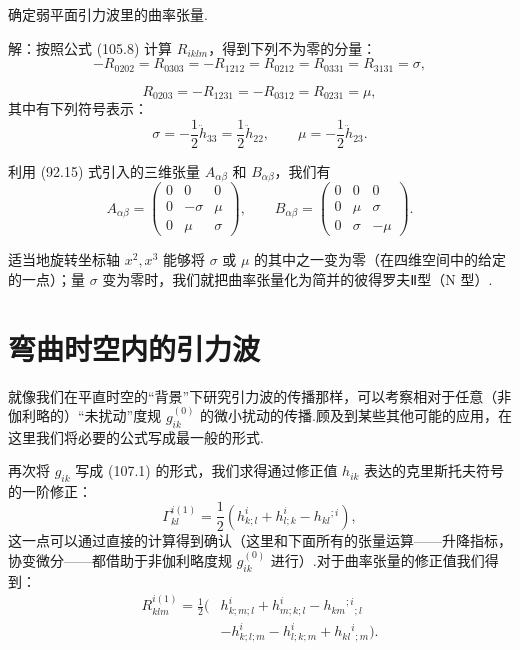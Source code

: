\begin{xiti}

\quad 确定弱平面引力波里的曲率张量.

解：按照公式 (105.8) 计算 $R_{iklm}$，得到下列不为零的分量：
\begin{equation*}
  -R_{0202}=R_{0303}=-R_{1212}=R_{0212}=R_{0331}=R_{3131}=\sigma,
\end{equation*}

\begin{equation*}
  R_{0203}=-R_{1231}=-R_{0312}=R_{0231}=\mu,
\end{equation*}
其中有下列符号表示：
\begin{equation*}
  \sigma=-\frac{1}{2}\ddot{h}_{33}=\frac{1}{2}\ddot{h}_{22},
  \qquad
  \mu=-\frac{1}{2}\ddot{h}_{23}.
\end{equation*}

利用 (92.15) 式引入的三维张量 $A_{\alpha\beta}$ 和 $B_{\alpha\beta}$，我们有
\begin{equation*}
  A_{\alpha\beta}=
  \begin{pmatrix}
    0 & 0 & 0\\
    0 & -\sigma & \mu\\
    0 & \mu & \sigma
  \end{pmatrix},
  \qquad
  B_{\alpha\beta}=
  \begin{pmatrix}
    0 & 0 & 0\\
    0 & \mu & \sigma\\
    0 & \sigma & -\mu
  \end{pmatrix}.
\end{equation*}

适当地旋转坐标轴 $x^{2},x^{3}$ 能够将 $\sigma$ 或 $\mu$ 的其中之一变为零（在四维空间中的给定的一点）；量 $\sigma$ 变为零时，我们就把曲率张量化为简并的彼得罗夫Ⅱ型（N 型）.

\end{xiti}

\section{弯曲时空内的引力波}

就像我们在平直时空的“背景”下研究引力波的传播那样，可以考察相对于任意（非伽利略的）“未扰动”度规 $g_{ik}^{(0)}$ 的微小扰动的传播.顾及到某些其他可能的应用，在这里我们将必要的公式写成最一般的形式.

再次将 $g_{ik}$ 写成 (107.1) 的形式，我们求得通过修正值 $h_{ik}$ 表达的克里斯托夫符号的一阶修正：
\begin{equation}
  \Gamma_{kl}^{i(1)}
  =\frac{1}{2}\left(h_{k;l}^{i}+h_{l;k}^{i}-h_{kl}{}^{;i}\right),
\end{equation}
这一点可以通过直接的计算得到确认（这里和下面所有的张量运算——升降指标，协变微分——都借助于非伽利略度规 $g_{ik}^{(0)}$ 进行）.对于曲率张量的修正值我们得到：
\begin{equation}
\begin{aligned}
  R_{klm}^{i(1)}
  =\frac{1}{2}\bigl(&h_{k;m;l}^{i}+h_{m;k;l}^{i}
  -h_{km}{}^{;i}{}_{;l}\\
  &-h_{k;l;m}^{i}-h_{l;k;m}^{i}+h_{kl}{}^{i}{}_{;m}\bigr).
\end{aligned}
\end{equation}

